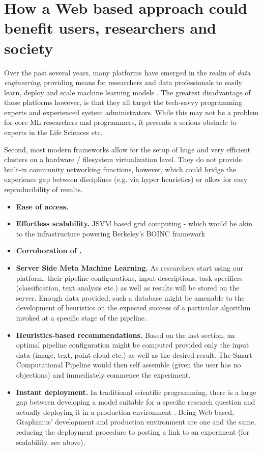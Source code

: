 \section{How a Web based approach could benefit users, researchers and society}
\label{sect:web_benefits}

Over the past several years, many platforms have emerged in the realm of \textit{data engineering}, providing means for researchers and data professionals to easily learn, deploy and scale machine learning models 
\cite{DataScienceTools2013}. The greatest disadvantage of those platforms however, is that they all target the tech-savvy programming experts and experienced system administrators. While this may not be a problem for core ML researchers and programmers, it presents a serious obstacle to experts in the Life Sciences etc.

Second, most modern frameworks allow for the setup of huge and very efficient clusters on a hardware / filesystem virtualization level. They do not provide built-in community networking functions, however, which could bridge the experience gap between disciplines (e.g. via hyper heuristics) or allow for easy reproducibility of results.


\begin{itemize}
	\item \textbf{Ease of access.}
	\item \textbf{Effortless scalability.} JSVM based grid computing - which would be akin to the infrastructure powering Berkeley's BOINC framework 
	\item \textbf{Corroboration of .}
	\item \textbf{Server Side Meta Machine Learning.} As researchers start using our platform, their pipeline configurations, input descriptions, task specifiers (classification, text analysis etc.) as well as results will be stored on the server. Enough data provided, such a database might be amenable to the development of heuristics on the expected success of a particular algorithm invoked at a specific stage of the pipeline.
	\item \textbf{Heuristics-based recommendations.} Based on the last section, an optimal pipeline configuration might be computed provided only the input data (image, text, point cloud etc.) as well as the desired result. The Smart Computational Pipeline would then self assemble (given the user has no objections) and immediately commence the experiment.
	\item \textbf{Instant deployment.} In traditional scientific programming, there is a large gap between developing a model suitable for a specific research question and actually deploying it in a production environment \citep{AnalLifecycle}. Being Web based, Graphinius' development and production environment are one and the same, reducing the deployment procedure to posting a link to an experiment (for scalability, see above).
\end{itemize}



